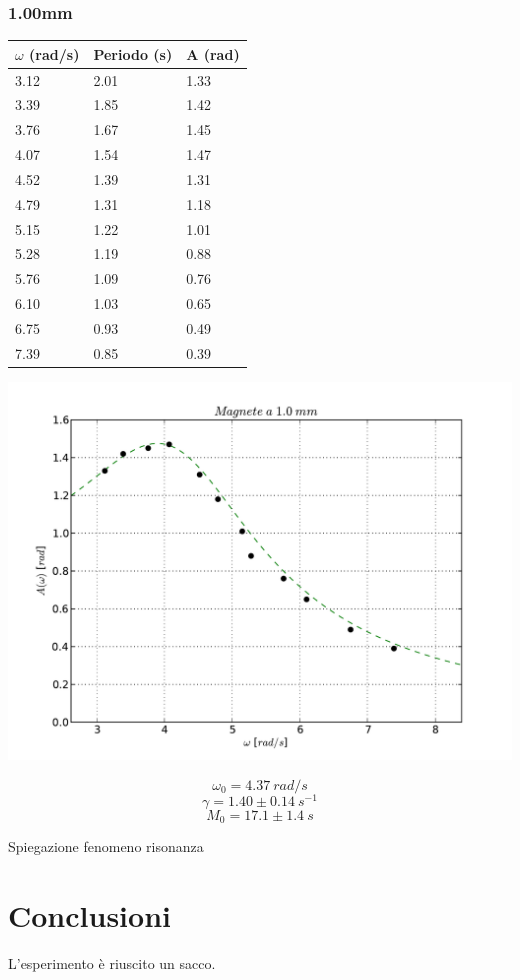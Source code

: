 \documentclass[a4paper,10pt]{report}
\begin{document}
\subsubsection{1.00mm}
\begin{center}
\begin{tabular}{l|l|l}
$\omega$ (rad/s) & Periodo (s) & A (rad) \\
\midrule
3.12 & 2.01 & 1.33 \\
3.39 & 1.85 & 1.42 \\
3.76 & 1.67 & 1.45 \\
4.07 & 1.54 & 1.47 \\
4.52 & 1.39 & 1.31 \\
4.79 & 1.31 & 1.18 \\
5.15 & 1.22 & 1.01 \\
5.28 & 1.19 & 0.88 \\
5.76 & 1.09 & 0.76 \\
6.10 & 1.03 & 0.65 \\
6.75 & 0.93 & 0.49 \\
7.39 & 0.85 & 0.39 \\
\midrule
\end{tabular}
\end{center}
\includegraphics[scale=0.75]{"../grafici/Magnetea10mm"}


$$ \omega_0 = 4.37\ rad/s $$
$$ \gamma = 1.40 \pm 0.14\ s^{-1}$$
$$ M_0 = 17.1 \pm 1.4\ s$$

Spiegazione fenomeno risonanza


\section{Conclusioni}
L'esperimento è riuscito un sacco.
\end{document}
